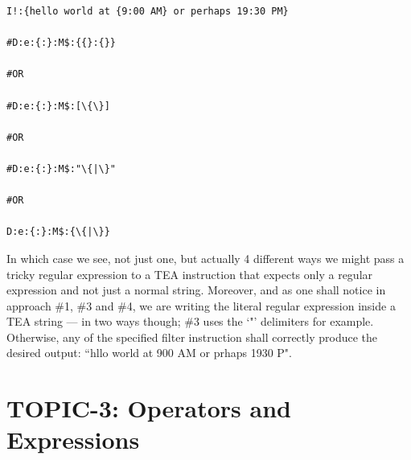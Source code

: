 \documentclass[a4paper, 18pt]{book} %
\begin{document}
{{{\begin{appendices}
\vspace{2em}

  \begin{tcolorbox}[teaterminalstyle, title=TEA Regular Expressions: Example 3: Methods of Writing Literal Regular Expressions Where TEA Regular Expressions are Expected, breakable]
  \begin{lstlisting}[language=TEA,breaklines=true,]
I!:{hello world at {9:00 AM} or perhaps 19:30 PM}

#D:e:{:}:M$:{{}:{}}

#OR

#D:e:{:}:M$:[\{\}]

#OR 

#D:e:{:}:M$:"\{|\}"

#OR

D:e:{:}:M$:{\{|\}}
   \end{lstlisting}
  \end{tcolorbox}

\vspace{2em}


In which case we see, not just one, but actually 4 different ways we might pass a tricky regular expression to a TEA instruction that expects only a regular expression and not just a normal string. Moreover, and as one shall notice in approach \#1, \#3 and \#4, we are writing the literal regular expression inside a TEA string --- in two ways though; \#3 uses the `"' delimiters for example. Otherwise, any of the specified filter instruction shall correctly produce the desired output: ``hllo world at 900 AM or prhaps 1930 P".



\section{TOPIC-3: Operators and Expressions}




\begin{center}
\end{center}
\end{appendices}}}}
\end{document}
